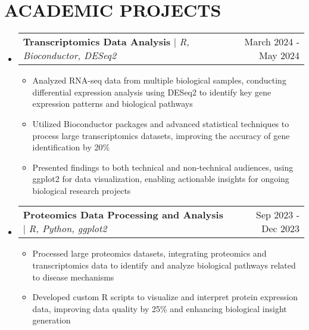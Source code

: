 \documentclass[letterpaper,11pt]{article}
\makeatletter
\newcommand{\resumeItem}[1]{
  \item\small{
    {#1 \vspace{-4pt}}
  }
}
\newcommand{\resumeProjectHeading}[2]{
    \item
    \begin{tabular*}{0.97\textwidth}{l@{\extracolsep{\fill}}r}
      \small#1 & #2 \\
    \end{tabular*}\vspace{-7pt}
}
\newcommand{\resumeSubHeadingListStart}{\begin{itemize}[leftmargin=0.15in, label={}]}
\newcommand{\resumeSubHeadingListEnd}{\end{itemize}}
\newcommand{\resumeItemListStart}{\begin{itemize}}
\newcommand{\resumeItemListEnd}{\end{itemize}\vspace{-5pt}}
\makeatother
\begin{document}
\section{\textbf{ACADEMIC PROJECTS}}
\vspace{-3pt}
    \resumeSubHeadingListStart
      \resumeProjectHeading
          {\textbf{Transcriptomics Data Analysis} $|$ \emph{R, Bioconductor, DESeq2}}{March 2024 - May 2024}
          \resumeItemListStart
            \resumeItem{Analyzed RNA-seq data from multiple biological samples, conducting differential expression analysis using DESeq2 to identify key gene expression patterns and biological pathways}
            \resumeItem{Utilized Bioconductor packages and advanced statistical techniques to process large transcriptomics datasets, improving the accuracy of gene identification by 20\%}
            \resumeItem{Presented findings to both technical and non-technical audiences, using ggplot2 for data visualization, enabling actionable insights for ongoing biological research projects}
          \resumeItemListEnd
          
      \resumeProjectHeading
          {\textbf{Proteomics Data Processing and Analysis} $|$ \emph{R, Python, ggplot2}}{Sep 2023 - Dec 2023}
          \resumeItemListStart
            \resumeItem{Processed large proteomics datasets, integrating proteomics and transcriptomics data to identify and analyze biological pathways related to disease mechanisms}
            \resumeItem{Developed custom R scripts to visualize and interpret protein expression data, improving data quality by 25\% and enhancing biological insight generation}
          \resumeItemListEnd
    \resumeSubHeadingListEnd

\vspace{-15pt}
\end{document}
